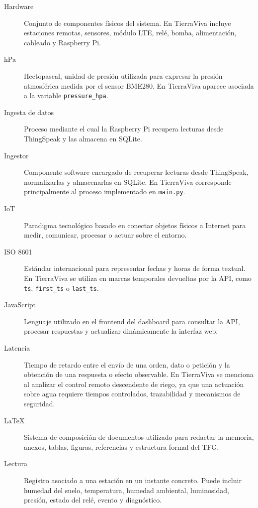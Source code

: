 \begin{description}
    \item[Hardware]
    Conjunto de componentes físicos del sistema. En TierraViva incluye estaciones remotas, sensores, módulo LTE, relé, bomba, alimentación, cableado y Raspberry Pi.

    \item[hPa]
    Hectopascal, unidad de presión utilizada para expresar la presión atmosférica medida por el sensor BME280. En TierraViva aparece asociada a la variable \texttt{pressure\_hpa}.

    \item[Ingesta de datos]
    Proceso mediante el cual la Raspberry Pi recupera lecturas desde ThingSpeak y las almacena en SQLite.

    \item[Ingestor]
    Componente software encargado de recuperar lecturas desde ThingSpeak, normalizarlas y almacenarlas en SQLite. En TierraViva corresponde principalmente al proceso implementado en \texttt{main.py}.

    \item[IoT]
    Paradigma tecnológico basado en conectar objetos físicos a Internet para medir, comunicar, procesar o actuar sobre el entorno.

    \item[ISO 8601]
    Estándar internacional para representar fechas y horas de forma textual. En TierraViva se utiliza en marcas temporales devueltas por la API, como \texttt{ts}, \texttt{first\_ts} o \texttt{last\_ts}.

    \item[JavaScript]
    Lenguaje utilizado en el frontend del dashboard para consultar la API, procesar respuestas y actualizar dinámicamente la interfaz web.

    \item[Latencia]
    Tiempo de retardo entre el envío de una orden, dato o petición y la obtención de una respuesta o efecto observable. En TierraViva se menciona al analizar el control remoto descendente de riego, ya que una actuación sobre agua requiere tiempos controlados, trazabilidad y mecanismos de seguridad.

    \item[LaTeX]
    Sistema de composición de documentos utilizado para redactar la memoria, anexos, tablas, figuras, referencias y estructura formal del TFG.

    \item[Lectura]
    Registro asociado a una estación en un instante concreto. Puede incluir humedad del suelo, temperatura, humedad ambiental, luminosidad, presión, estado del relé, evento y diagnóstico.


\end{description}
